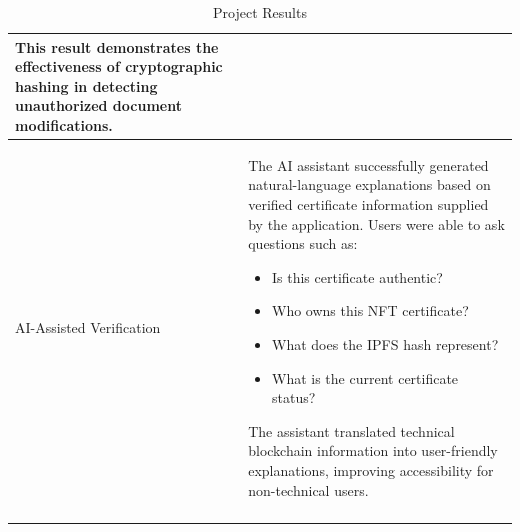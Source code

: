 \begin{longtable}{|m{3.5cm}|m{10.5cm}|}
    This result demonstrates the effectiveness of cryptographic hashing in detecting unauthorized document modifications.\\
    \hline

    AI-Assisted Verification
    & The AI assistant successfully generated natural-language explanations based on verified certificate information supplied by the application. Users were able to ask questions such as:
        \begin{itemize}
            \item Is this certificate authentic?
            
            \item Who owns this NFT certificate?
            
            \item What does the IPFS hash represent?
            
            \item What is the current certificate status?
        \end{itemize}
        
        The assistant translated technical blockchain information into user-friendly explanations, improving accessibility for non-technical users.\\
    \hline

    \caption{Project Results}
    \label{tab:project_result}
\end{longtable}